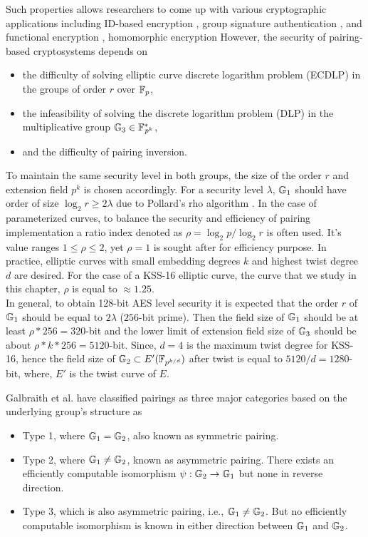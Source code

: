 Such properties allows researchers to come up with various cryptographic applications including ID-based encryption \cite{C:BonFra01}, group signature authentication \cite{C:BonBoySha04}, and functional encryption \cite{C:OkaTak10}, homomorphic encryption \cite{EC:OkaUch98a,CCS:NacSte98,PAIRING:OkaTak08} However, the security of pairing-based cryptosystems depends  on 
\begin{itemize}
	\item  the difficulty of solving elliptic curve discrete logarithm problem (ECDLP) in the groups of order $r$ over ${\mathbb{F}}_{p}$,
	\item  the infeasibility of solving the discrete logarithm problem (DLP) in the multiplicative group ${\mathbb{G}}_{3} \in {{\mathbb{F}}^{\ast}}_{\!\!\!p^{k}}$,
	\item and the difficulty of pairing inversion.
\end{itemize}
To maintain the same security level in both groups, the size of the order $r$ and extension field $p^k$ is chosen accordingly. 
For a security level $\lambda$, ${\mathbb{G}}_{1}$ should have order of size $\log_2 r \geq 2\lambda$ due to Pollard's rho algorithm \cite{1978-pollard-kangaroo}.
In the case of parameterized curves, to balance the security and efficiency of pairing implementation a ratio index denoted as $\rho = \log_2 p/ \log_2 r$ is often used.
It's value ranges $1\leq  \rho  \leq 2$, yet $\rho=1$ is sought after for efficiency purpose. 
In practice, elliptic curves with small embedding degrees $k$ and highest twist degree $d$ are desired.
For the case of a KSS-16 elliptic curve, the curve that we study in this chapter, $\rho$ is equal to  $ \approx 1.25$. \\
In general, to obtain 128-bit AES level security it is expected that the order $r$ of ${\mathbb{G}}_{1}$ should be equal to $2\lambda $ ($256$-bit prime).
Then the field size  of  ${\mathbb{G}}_{1}$ should be at least $\rho*256 = 320$-bit and the lower limit of extension field size of ${\mathbb{G}}_{3}$ should be about $\rho*k*256= 5120$-bit.
Since,  $d=4$ is the maximum twist degree for KSS-16, hence the field size of ${\mathbb{G}}_{2} \subset E'(\mathbb{F}_{p^{k/d}})$ after twist is  equal to $5120/d=1280$-bit, where, $E'$ is the twist curve of $E$.


Galbraith et al. \cite{galbraith2008pairings} have classified pairings as three major categories based on the underlying group's structure as 
\begin{itemize}
	\item Type 1, where ${\mathbb{G}}_{1} = {\mathbb{G}}_{2}$, also known as symmetric pairing. 
	\item Type 2, where ${\mathbb{G}}_{1} \neq {\mathbb{G}}_{2}$, known as asymmetric pairing. There exists an efficiently computable isomorphism $\psi : {\mathbb{G}}_{2} \to {\mathbb{G}}_{1}$ but none in reverse direction.
	\item Type 3, which is also asymmetric pairing, i.e., ${\mathbb{G}}_{1} \neq {\mathbb{G}}_{2}$. But no efficiently computable isomorphism is known in either direction  between ${\mathbb{G}}_{1}$ and ${\mathbb{G}}_{2}$.
\end{itemize}


